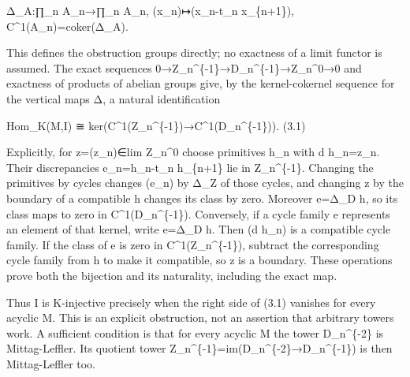 Δ\_\allowbreak{}A:\allowbreak{}∏\_\allowbreak{}n A\_\allowbreak{}n\allowbreak{}→∏\_\allowbreak{}n A\_\allowbreak{}n,\allowbreak{} (x\_\allowbreak{}n)\allowbreak{}\allowbreak{}↦(x\_\allowbreak{}n-t\_\allowbreak{}n x\_\allowbreak{}\{n\allowbreak{}+1\})\allowbreak{},\allowbreak{} C\textasciicircum{}1(A\_\allowbreak{}n)\allowbreak{}\allowbreak{}=coker(Δ\_\allowbreak{}A)\allowbreak{}.

This defines the obstruction groups directly; no exactness of a limit functor is assumed. The exact sequences 0\allowbreak{}→Z\_\allowbreak{}n\textasciicircum{}\{-1\}\allowbreak{}→D\_\allowbreak{}n\textasciicircum{}\{-1\}\allowbreak{}→Z\_\allowbreak{}n\textasciicircum{}0\allowbreak{}→0 and exactness of products of abelian groups give,\allowbreak{} by the kernel-cokernel sequence for the vertical maps Δ,\allowbreak{} a natural identification

Hom\_\allowbreak{}K(M,\allowbreak{}I)\allowbreak{} ≅ ker(C\textasciicircum{}1(Z\_\allowbreak{}n\textasciicircum{}\{-1\})\allowbreak{}\allowbreak{}→C\textasciicircum{}1(D\_\allowbreak{}n\textasciicircum{}\{-1\})\allowbreak{})\allowbreak{}. (3.1)\allowbreak{}

Explicitly,\allowbreak{} for z\allowbreak{}=(z\_\allowbreak{}n)\allowbreak{}\allowbreak{}∈lim Z\_\allowbreak{}n\textasciicircum{}0 choose primitives h\_\allowbreak{}n with d h\_\allowbreak{}n\allowbreak{}=z\_\allowbreak{}n. Their discrepancies e\_\allowbreak{}n\allowbreak{}=h\_\allowbreak{}n-t\_\allowbreak{}n h\_\allowbreak{}\{n\allowbreak{}+1\} lie in Z\_\allowbreak{}n\textasciicircum{}\{-1\}. Changing the primitives by cycles changes (e\_\allowbreak{}n)\allowbreak{} by Δ\_\allowbreak{}Z of those cycles,\allowbreak{} and changing z by the boundary of a compatible h changes its class by zero. Moreover e\allowbreak{}=Δ\_\allowbreak{}D h,\allowbreak{} so its class maps to zero in C\textasciicircum{}1(D\_\allowbreak{}n\textasciicircum{}\{-1\})\allowbreak{}. Conversely,\allowbreak{} if a cycle family e represents an element of that kernel,\allowbreak{} write e\allowbreak{}=Δ\_\allowbreak{}D h. Then (d h\_\allowbreak{}n)\allowbreak{} is a compatible cycle family. If the class of e is zero in C\textasciicircum{}1(Z\_\allowbreak{}n\textasciicircum{}\{-1\})\allowbreak{},\allowbreak{} subtract the corresponding cycle family from h to make it compatible,\allowbreak{} so z is a boundary. These operations prove both the bijection and its naturality,\allowbreak{} including the exact map.

Thus I is K-injective precisely when the right side of (3.1)\allowbreak{} vanishes for every acyclic M. This is an explicit obstruction,\allowbreak{} not an assertion that arbitrary towers work. A sufficient condition is that for every acyclic M the tower D\_\allowbreak{}n\textasciicircum{}\{-2\} is Mittag-Leffler. Its quotient tower Z\_\allowbreak{}n\textasciicircum{}\{-1\}\allowbreak{}=im(D\_\allowbreak{}n\textasciicircum{}\{-2\}\allowbreak{}→D\_\allowbreak{}n\textasciicircum{}\{-1\})\allowbreak{} is then Mittag-Leffler too.

